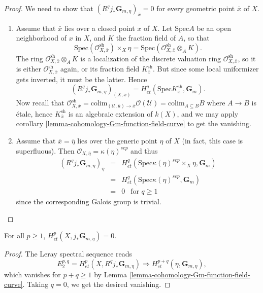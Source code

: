 \begin{proof}
We need to show that $(R^q j_*\mathbf{G}_{m,\eta})_{\bar x} = 0$ for every
geometric point $\bar x$ of $X$.
\begin{enumerate}
\item
Assume that $\bar x$ lies over a closed point $x$ of $X$. Let $\text{Spec} A$
be an open neighborhood of $x$ in $X$, and $K$ the fraction field of $A$, so
that
$$
\text{Spec}(\mathcal{O}^\text{sh}_{X,\bar x}) \times_X \eta =
\text{Spec}(\mathcal{O}^\text{sh}_{X,\bar x} \otimes_A K).
$$
The ring $\mathcal{O}^\text{sh}_{X,\bar x} \otimes_A K$ is a localization of
the discrete valuation ring $\mathcal{O}^\text{sh}_{X,\bar x}$, so it is either
$\mathcal{O}^\text{sh}_{X,\bar x}$ again, or its fraction field
$K^\text{sh}_{\bar x}$. But since some local uniformizer gets inverted, it must
be the latter. Hence
$$
(R^q j_*\mathbf{G}_{m,\eta})_{(X, \bar x)} = H_{et}^q(\text{Spec}
K^\text{sh}_{\bar x}, \mathbf{G}_m).
$$
Now recall that $\mathcal{O}^\text{sh}_{X, \bar x} =
\text{colim}_{(\mathcal{U},\bar u) \to \bar x} \mathcal{O} (\mathcal{U}) =
\text{colim}_{A \subseteq B} B$ where $A \to B$ is \'etale, hence
$K^\text{sh}_{\bar x}$ is an algebraic extension of $k(X)$, and we may apply
corollary \ref{lemma-cohomology-Gm-function-field-curve} to get the vanishing.
\item
Assume that $\bar x = \bar \eta$ lies over the generic point $\eta$ of $X$ (in
fact, this case is superfluous). Then $\mathcal{O}_{X,\bar \eta} =
\kappa(\eta)^{sep}$ and thus
\begin{eqnarray*}
(R^q j_*\mathbf{G}_{m,\eta})_{\bar \eta}
& = &
H_{et}^q(\text{Spec} \kappa(\eta)^{sep} \times_X \eta, \mathbf{G}_m) \\
& = & H_{et}^q (\text{Spec} \kappa(\eta)^{sep}, \mathbf{G}_m) \\
& = & 0 \ \ \text{ for } q \geq 1
\end{eqnarray*}
since the corresponding Galois group is trivial.
\end{enumerate}
\end{proof}

\begin{lemma}
\label{lemma-cohomology-jstar-Gm}
For all $p \geq 1$, $H_{et}^p(X, j_*\mathbf{G}_{m,\eta}) = 0$.
\end{lemma}

\begin{proof}
The Leray spectral sequence reads
$$
E_2^{p,q} = H_{et}^p(X, R^qj_*\mathbf{G}_{m,\eta}) \Rightarrow
H_{et}^{p+q}(\eta, \mathbf{G}_{m,\eta}),
$$
which vanishes for $p+q \geq 1$ by
Lemma \ref{lemma-cohomology-Gm-function-field-curve}. Taking
$q = 0$, we get the desired vanishing.
\end{proof}

